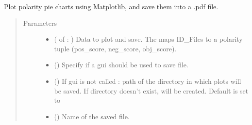 \documentclass[letterpaper,10pt,english]{sphinxmanual}
\begin{document}
\begin{fulllineitems}
\label{\detokenize{utils:loacore.utils.plot_polarities.save_polarity_pie_charts}}
Plot polarity pie charts using Matplotlib, and save them into a .pdf file.
\begin{quote}\begin{description}
\item[{Parameters}] \leavevmode\begin{itemize}
\item {} 
 ( of  : ) \textendash{} Data to plot and save. The  maps ID\_Files to a polarity tuple (pos\_score, neg\_score, obj\_score).

\item {} 
 () \textendash{} Specify if a gui should be used to save file.

\item {} 
 () \textendash{} If gui is not called : path of the directory in which plots will be saved.
If directory doesn’t exist, will be created.
Default is set to 

\item {} 
 () \textendash{} Name of the saved file.

\end{itemize}

\end{description}\end{quote}

\end{fulllineitems}

\label{\detokenize{utils:module-loacore.utils.print_patterns}}\label{\detokenize{utils:module-loacore.utils.plot_frequencies}}
\end{document}
